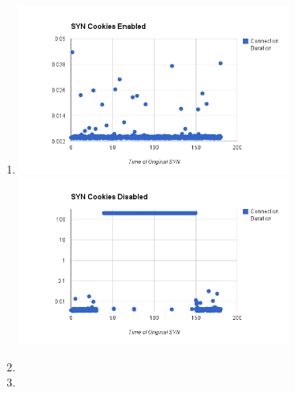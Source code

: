 \documentclass[11pt]{article}
\begin{document}
\begin{enumerate}
\begin{center}
  \end{center}
\item \text{}
  \begin{center}
    \includegraphics[width=3.5in]{with-cookies.png} \\
    \includegraphics[width=3.5in]{without-cookies.png}
  \end{center}
\item
\item
\end{enumerate}
\end{document}
